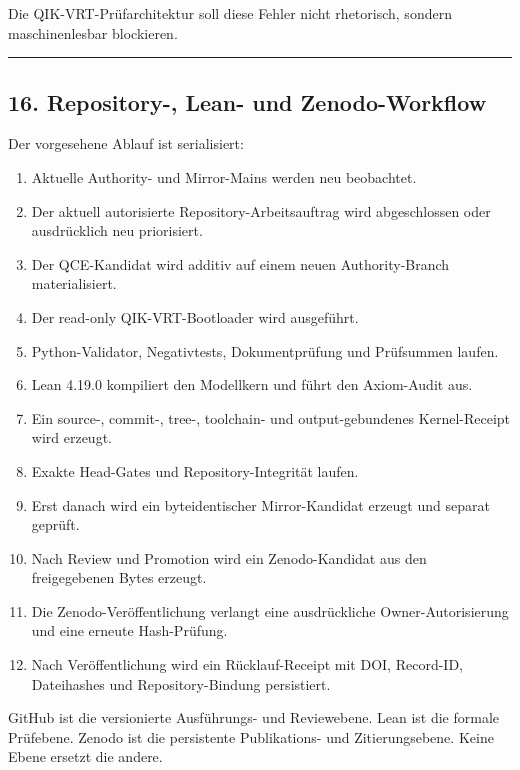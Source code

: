 \documentclass[
  11pt,
  a4paper,
]{article}
\providecommand{\tightlist}{%
  \setlength{\itemsep}{0pt}\setlength{\parskip}{0pt}}
\begin{document}
Die QIK-VRT-Prüfarchitektur soll diese Fehler nicht rhetorisch, sondern
maschinenlesbar blockieren.

\begin{center}\rule{0.5\linewidth}{0.5pt}\end{center}

\subsection{16. Repository-, Lean- und
Zenodo-Workflow}\label{repository--lean--und-zenodo-workflow}

Der vorgesehene Ablauf ist serialisiert:

\begin{enumerate}
\def\labelenumi{\arabic{enumi}.}
\tightlist
\item
  Aktuelle Authority- und Mirror-Mains werden neu beobachtet.
\item
  Der aktuell autorisierte Repository-Arbeitsauftrag wird abgeschlossen
  oder ausdrücklich neu priorisiert.
\item
  Der QCE-Kandidat wird additiv auf einem neuen Authority-Branch
  materialisiert.
\item
  Der read-only QIK-VRT-Bootloader wird ausgeführt.
\item
  Python-Validator, Negativtests, Dokumentprüfung und Prüfsummen laufen.
\item
  Lean 4.19.0 kompiliert den Modellkern und führt den Axiom-Audit aus.
\item
  Ein source-, commit-, tree-, toolchain- und output-gebundenes
  Kernel-Receipt wird erzeugt.
\item
  Exakte Head-Gates und Repository-Integrität laufen.
\item
  Erst danach wird ein byteidentischer Mirror-Kandidat erzeugt und
  separat geprüft.
\item
  Nach Review und Promotion wird ein Zenodo-Kandidat aus den
  freigegebenen Bytes erzeugt.
\item
  Die Zenodo-Veröffentlichung verlangt eine ausdrückliche
  Owner-Autorisierung und eine erneute Hash-Prüfung.
\item
  Nach Veröffentlichung wird ein Rücklauf-Receipt mit DOI, Record-ID,
  Dateihashes und Repository-Bindung persistiert.
\end{enumerate}

GitHub ist die versionierte Ausführungs- und Reviewebene. Lean ist die
formale Prüfebene. Zenodo ist die persistente Publikations- und
Zitierungsebene. Keine Ebene ersetzt die andere.
\end{document}
